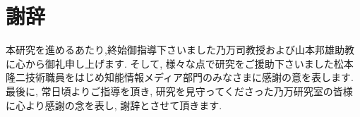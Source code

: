 \chapter*{謝辞}\label{chap:thank}
本研究を進めるあたり,終始御指導下さいました乃万司教授および山本邦雄助教に心から御礼申し上げます. そして, 様々な点で研究をご援助下さいました松本隆二技術職員をはじめ知能情報メディア部門のみなさまに感謝の意を表します. 最後に, 常日頃よりご指導を頂き, 研究を見守ってくださった乃万研究室の皆様に心より感謝の念を表し, 謝辞とさせて頂きます.
